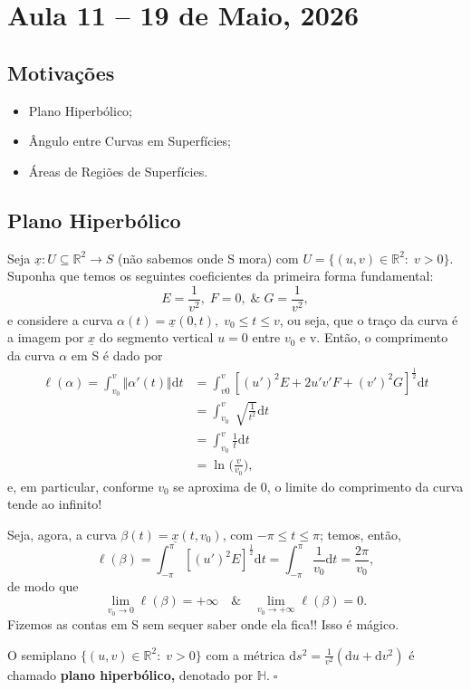 \documentclass[../differential_geometry.tex]{subfiles}
\begin{document}
\section{Aula 11 -- 19 de Maio, 2026}
\subsection{Motivações}
\begin{itemize}
	\item Plano Hiperbólico;
	\item Ângulo entre Curvas em Superfícies;
	\item Áreas de Regiões de Superfícies.
\end{itemize}
\subsection{Plano Hiperbólico}

\begin{example}
	Seja \(\underline{x}:U\subseteq \mathbb{R}^{2}\rightarrow S\) (não sabemos onde S mora) com \(U = \{(u, v)\in \mathbb{R}^{2}:\; v > 0\}\).
	Suponha que temos os seguintes coeficientes da primeira forma fundamental:
	\[
		E = \frac{1}{v^{2}},\; F = 0,\; \& \; G = \frac{1}{v^{2}},
	\]
	e considere a curva \(\alpha (t) = \underline{x}(0, t),\; v_{0}\leq t \leq v\), ou seja, que o traço da curva é a imagem por \(\underline{x}\) do segmento vertical \(u=0\) entre \(v_{0}\) e v.
	Então, o comprimento da curva \(\alpha \) em S é dado por
	\begin{align*}
		\ell (\alpha ) = \int_{v_{0}}^{v}\Vert \alpha '(t) \Vert \mathrm{d}t & = \int_{v0}^{v}[(u')^{2}E + 2u'v'F + (v')^{2}G]^{\frac{1}{2}} \mathrm{d}t \\
		                                                                     & = \int_{v_{0}}^{v}\sqrt[]{\frac{1}{t^{2}}} \mathrm{d}t                    \\
		                                                                     & = \int_{v_{0}}^{v}\frac{1}{t} \mathrm{d}t                                 \\
		                                                                     & = \ln^{}{\biggl(\frac{v}{v_{0}}\biggr)},
	\end{align*}
	e, em particular, conforme \(v_{0}\) se aproxima de 0, o limite do comprimento da curva tende ao infinito!

	Seja, agora, a curva \(\beta (t) = \underline{x}(t, v_{0})\), com \(-\pi \leq t \leq \pi \); temos, então,
	\[
		\ell (\beta ) = \int_{-\pi }^{\pi }[(u')^{2}E]^{\frac{1}{2}} \mathrm{d}t = \int_{-\pi }^{\pi }\frac{1}{v_{0}} \mathrm{d}t = \frac{2\pi }{v_{0}},
	\]
	de modo que
	\[
		\lim_{v_{0}\to 0}\ell (\beta ) = +\infty \quad\&\quad \lim_{v_{0}\to +\infty}\ell (\beta ) = 0.
	\]
	Fizemos as contas em S sem sequer saber onde ela fica!! Isso é mágico.
\end{example}
\begin{def*}
	O semiplano \(\{(u, v)\in \mathbb{R}^{2}:\; v > 0\} \) com a métrica \(\mathrm{d}s^{2} = \frac{1}{v^{2}}(\mathrm{d}u + \mathrm{d}v^{2})\) é chamado \textbf{plano hiperbólico,} denotado por \(\mathbb{H}.\; \square\)
\end{def*}
\end{document}
